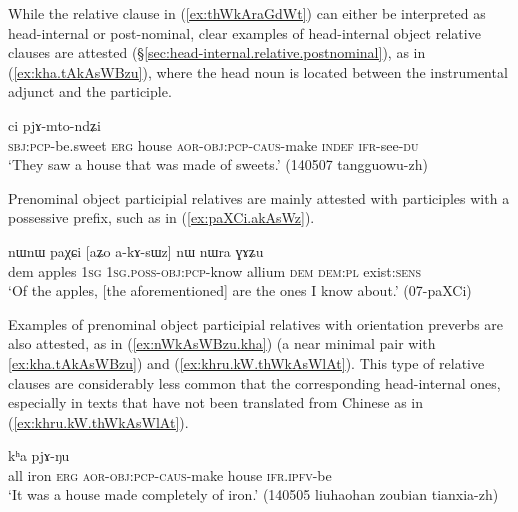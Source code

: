 While the relative clause in (\ref{ex:thWkAraGdWt}) can either be interpreted as head-internal or post-nominal, clear examples of head-internal object relative clauses are attested (§\ref{sec:head-internal.relative.postnominal}), as in (\ref{ex:kha.tAkAsWBzu}), where the head noun  is located between the instrumental adjunct  and the participle.
 
\begin{exe}
\ex \label{ex:kha.tAkAsWBzu}
 ci pjɤ-mto-ndʑi\\
\textsc{sbj}:\textsc{pcp}-be.sweet \textsc{erg} house \textsc{aor}-\textsc{obj}:\textsc{pcp}-\textsc{caus}-make \textsc{indef} \textsc{ifr}-see-\textsc{du}\\
\glt `They saw a house that was made of sweets.' (140507 tangguowu-zh)
\end{exe}

Prenominal object participial relatives are mainly attested with participles with a possessive prefix, such as  in (\ref{ex:paXCi.akAsWz}). 

\begin{exe}
\ex \label{ex:paXCi.akAsWz}
\gll   nɯnɯ paχɕi [aʑo a-kɤ-sɯz] nɯ nɯra ɣɤʑu \\
dem apples \textsc{1sg} \textsc{1sg}.\textsc{poss}-\textsc{obj}:\textsc{pcp}-know allium \textsc{dem} \textsc{dem}:\textsc{pl} exist:\textsc{sens} \\
\glt `Of the apples, [the aforementioned] are the ones I know about.' (07-paXCi)
\end{exe}  

Examples of prenominal object participial relatives with orientation preverbs are also attested, as in (\ref{ex:nWkAsWBzu.kha}) (a near minimal pair with \ref{ex:kha.tAkAsWBzu}) and (\ref{ex:khru.kW.thWkAsWlAt}). This type of relative clauses are considerably less common that the corresponding head-internal ones, especially in texts that have not been translated from Chinese as in (\ref{ex:khru.kW.thWkAsWlAt}).

\begin{exe}
\ex \label{ex:nWkAsWBzu.kha}
 kʰa pjɤ-ŋu \\
all iron \textsc{erg} \textsc{aor}-\textsc{obj}:\textsc{pcp}-\textsc{caus}-make house \textsc{ifr}.\textsc{ipfv}-be \\
\glt `It was a house made completely of iron.' (140505 liuhaohan zoubian tianxia-zh)
\end{exe}


